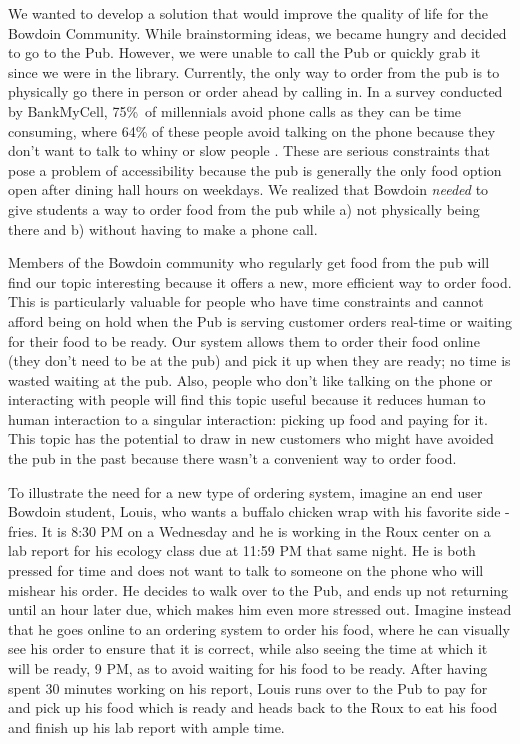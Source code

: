 \documentclass[runningheads]{llncs}
\begin{document}
We wanted to develop a solution that would improve the quality of life for the Bowdoin Community. While brainstorming ideas, we became hungry and decided to go to the Pub. However, we were unable to call the Pub or quickly grab it since we were in the library. Currently, the only way to order from the pub is to physically go there in person or order ahead by calling in. In a survey conducted by BankMyCell, 75\%\ of millennials avoid phone calls as they can be time consuming, where 64\% of these people avoid talking on the phone because they don’t want to talk to whiny or slow people \cite{bankmycellwebsite}.  These are serious constraints that pose a problem of accessibility because the pub is generally the only food option open after dining hall hours on weekdays. We realized that Bowdoin \textit{needed} to give students a way to order food from the pub while a) not physically being there and b) without having to make a phone call. 

Members of the Bowdoin community who regularly get food from the pub will find our topic interesting because it offers a new, more efficient way to order food. This is particularly valuable for people who have time constraints and cannot afford being on hold when the Pub is serving customer orders real-time or waiting for their food to be ready. Our system allows them to order their food online (they don’t need to be at the pub) and pick it up when they are ready; no time is wasted waiting at the pub. Also, people who don’t like talking on the phone or interacting with people will find this topic useful because it reduces human to human interaction to a singular interaction: picking up food and paying for it. This topic has the potential to draw in new customers who might have avoided the pub in the past because there wasn’t a convenient way to order food.

To illustrate the need for a new type of ordering system, imagine an end user Bowdoin student, Louis, who wants a buffalo chicken wrap with his favorite side - fries. It is 8:30 PM on a Wednesday and he is working in the Roux center on a lab report for his ecology class due at 11:59 PM that same night. He is both pressed for time and does not want to talk to someone on the phone who will mishear his order. He decides to walk over to the Pub, and ends up not returning until an hour later due, which makes him even more stressed out. Imagine instead that he goes online to an ordering system to order his food, where he can visually see his order to ensure that it is correct, while also seeing the time at which it will be ready, 9 PM, as to avoid waiting for his food to be ready. After having spent 30 minutes working on his report, Louis runs over to the Pub to pay for and pick up his food which is ready and heads back to the Roux to eat his food and finish up his lab report with ample time. 
\end{document}
